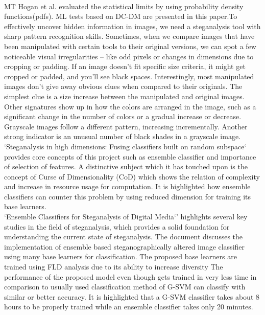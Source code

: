 \\MT Hogan et al.\cite{3} evaluated the statistical limits by using probability density functions(pdfs). ML tests based on DC-DM are presented in this paper.To effectively uncover hidden information in images, we need a steganalysis tool with sharp pattern recognition skills. Sometimes, when we compare images that have been manipulated with certain tools to their original versions, we can spot a few noticeable visual irregularities – like odd pixels or changes in dimensions due to cropping or padding. If an image doesn't fit specific size criteria, it might get cropped or padded, and you'll see black spaces. Interestingly, most manipulated images don't give away obvious clues when compared to their originals. The simplest clue is a size increase between the manipulated and original images. Other signatures show up in how the colors are arranged in the image, such as a significant change in the number of colors or a gradual increase or decrease. Grayscale images follow a different pattern, increasing incrementally. Another strong indicator is an unusual number of black shades in a grayscale image.\\
`Steganalysis in high dimensions: Fusing classifiers built on random subspace`\cite{8} provides core concepts of this project such as ensemble classifier and importance of selection of features. A distinctive subject which it has touched upon is the concept of Curse of Dimensionality (CoD) which shows the relation of complexity and increase in  resource usage for computation. It is highlighted how ensemble classifiers can counter this problem by using reduced dimension for training its base learners.\\
`Ensemble Classifiers for Steganalysis of Digital Media`'\cite{5} highlights several key studies in the field of steganalysis, which provides a solid foundation for understanding the current state of steganalysis. The document discusses the implementation of ensemble based steganographically altered image classifier using many base learners for classification. The proposed base learners are trained using FLD analysis due to its ability to increase diversity The performance of the proposed model even though gets trained in very less time in comparison to usually used classification method of G-SVM can classify with similar or better accuracy. It is highlighted that a G-SVM classifier takes about 8 hours to be properly trained while an ensemble classifier takes only 20 minutes.\\                   

